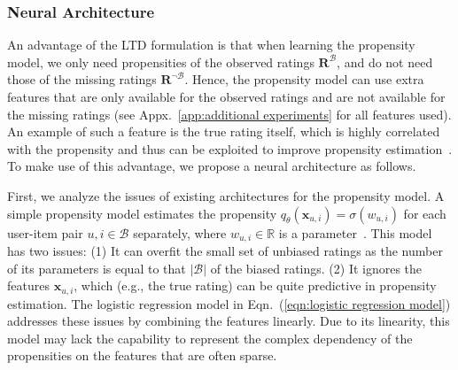 \documentclass[letterpaper]{article} %
\newcommand{\matrixize}[1]{\mathbf{#1}}
\newcommand{\vectorize}[1]{\bm{#1}}
\newcommand{\realNumber}{\mathbb{R}}
\newcommand{\obsBiasedPairs}{\mathcal{B}}
\newcommand{\misBiasedPairs}{{\lnot\mathcal{B}}}
\newcommand{\trueRatings}{\matrixize{R}}
\newcommand{\featureMark}{x}
\newcommand{\biasedFeatures}{\vectorize{\featureMark}_{u,i}}
\newcommand{\propensityName}{q}
\newcommand{\propensityParam}{\theta}
\newcommand{\propensityModel}{\propensityName_\propensityParam(\biasedFeatures)}
\begin{document}
\subsubsection{Neural Architecture}
An advantage of the LTD formulation is that when learning the propensity model, we only need propensities of the observed ratings $\trueRatings^\obsBiasedPairs$, and do not need those of the missing ratings $\trueRatings^\misBiasedPairs$.
Hence, the propensity model can use extra features that are only available for the observed ratings and are not available for the missing ratings (see Appx.~\ref{app:additional experiments} for all features used).
An example of such a feature is the true rating itself, which is highly correlated with the propensity and thus can be exploited to improve propensity estimation~\cite{marlin2007collaborative}.
To make use of this advantage, we propose a neural architecture as follows.

First, we analyze the issues of existing architectures for the propensity model.
A simple propensity model estimates the propensity $\propensityModel=\sigma(w_{u,i})$ for each user-item pair $u,i\in\obsBiasedPairs$ separately, where $w_{u,i}\in\realNumber$ is a parameter~\cite{ren2018learning}.
This model has two issues:
(1) It can overfit the small set of unbiased ratings as the number of its parameters is equal to that $|\obsBiasedPairs|$ of the biased ratings.
(2) It ignores the features $\biasedFeatures$, which (e.g., the true rating) can be quite predictive in propensity estimation.
The logistic regression model in Eqn.~(\ref{eqn:logistic regression model}) addresses these issues by combining the features linearly.
Due to its linearity, this model may lack the capability to represent the complex dependency of the propensities on the features that are often sparse.
\end{document}
